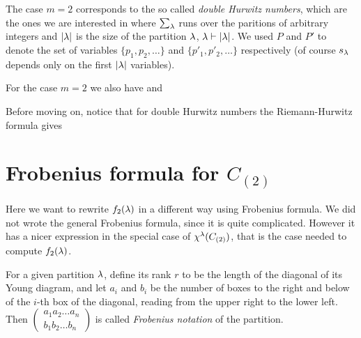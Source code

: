 \documentclass[../main/main.tex]{subfiles}
\begin{document}
The case $m=2$ corresponds to the so called \emph{double Hurwitz numbers}, which are the ones we are interested in
where $\sum_\lambda$ runs over the paritions of arbitrary integers and $|\lambda|$ is the size of the partition $\lambda$, $\lambda\vdash|\lambda|$. We used $P$ and $P'$ to denote the set of variables $\{p_1,p_2,\ldots\}$ and $\{p'_1,p'_2,\ldots\}$ respectively (of course $s_\lambda$ depends only on the first $|\lambda|$ variables). 

For the case $m=2$ we also have
and

Before moving on, notice that for double Hurwitz numbers the Riemann-Hurwitz formula gives

\section{Frobenius formula for $C_{(2)}$}

Here we want to rewrite $f_2(\lambda)$ in a different way using Frobenius formula. We did not wrote the general Frobenius formula, since it is quite complicated. However it has a nicer expression in the special case of $\chi^\lambda(C_{(2)})$, that is the case needed to compute $f_2(\lambda)$.

For a given partition $\lambda$, define its rank $r$ to be the length of the diagonal of its Young diagram, and let $a_i$ and $b_i$ be the number of boxes to the right and below of the $i$-th box of the diagonal, reading from the upper right to the lower left. Then $\begin{pmatrix}a_1a_2\ldots a_n\\b_1b_2\ldots b_n\end{pmatrix}$ is called \emph{Frobenius notation} of the partition. 
\end{document}
